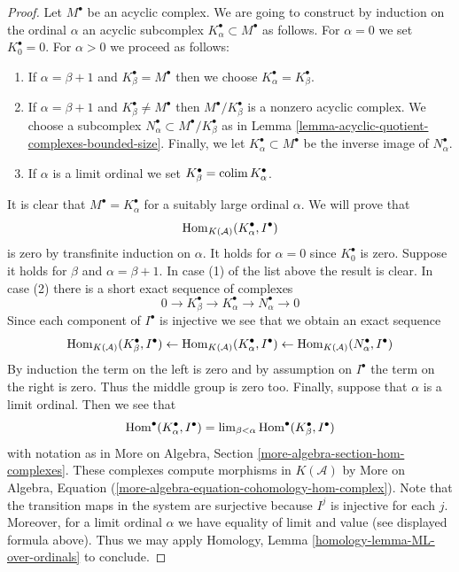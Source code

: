 \begin{proof}
Let $M^\bullet$ be an acyclic complex. We are going to construct by
induction on the ordinal $\alpha$ an acyclic subcomplex
$K_\alpha^\bullet \subset M^\bullet$ as follows.
For $\alpha = 0$ we set $K_0^\bullet = 0$. For $\alpha > 0$
we proceed as follows:
\begin{enumerate}
\item If $\alpha = \beta + 1$ and $K_\beta^\bullet = M^\bullet$
then we choose $K_\alpha^\bullet = K_\beta^\bullet$.
\item If $\alpha = \beta + 1$ and $K_\beta^\bullet \not = M^\bullet$
then $M^\bullet/K_\beta^\bullet$ is a nonzero acyclic complex.
We choose a subcomplex $N_\alpha^\bullet \subset M^\bullet/K_\beta^\bullet$
as in Lemma \ref{lemma-acyclic-quotient-complexes-bounded-size}.
Finally, we let $K_\alpha^\bullet \subset M^\bullet$
be the inverse image of $N_\alpha^\bullet$.
\item If $\alpha$ is a limit ordinal we set
$K_\beta^\bullet = \mathop{\mathrm{colim}}\nolimits K_\alpha^\bullet$.
\end{enumerate}
It is clear that $M^\bullet = K_\alpha^\bullet$ for a suitably large
ordinal $\alpha$. We will prove that
$$
\mathop{\mathrm{Hom}}\nolimits_{K(\mathcal{A})}(K_\alpha^\bullet, I^\bullet)
$$
is zero by transfinite induction on $\alpha$. It holds for $\alpha = 0$
since $K_0^\bullet$ is zero. Suppose it holds for $\beta$ and
$\alpha = \beta + 1$. In case (1) of the list above the result is clear.
In case (2) there is a short exact sequence of complexes
$$
0 \to K_\beta^\bullet \to K_\alpha^\bullet \to N_\alpha^\bullet \to 0
$$
Since each component of $I^\bullet$ is injective we see that we obtain
an exact sequence
$$
\mathop{\mathrm{Hom}}\nolimits_{K(\mathcal{A})}(K_\beta^\bullet, I^\bullet) \leftarrow
\mathop{\mathrm{Hom}}\nolimits_{K(\mathcal{A})}(K_\alpha^\bullet, I^\bullet) \leftarrow
\mathop{\mathrm{Hom}}\nolimits_{K(\mathcal{A})}(N_\alpha^\bullet, I^\bullet)
$$
By induction the term on the left is zero and by assumption on $I^\bullet$
the term on the right is zero. Thus the middle group is zero too.
Finally, suppose that $\alpha$ is a limit ordinal. Then we see that
$$
\mathop{\mathrm{Hom}}\nolimits^\bullet(K_\alpha^\bullet, I^\bullet) =
\mathop{\mathrm{lim}}\nolimits_{\beta < \alpha} \mathop{\mathrm{Hom}}\nolimits^\bullet(K_\beta^\bullet, I^\bullet)
$$
with notation as in
More on Algebra, Section \ref{more-algebra-section-hom-complexes}.
These complexes compute morphisms in $K(\mathcal{A})$ by
More on Algebra, Equation
(\ref{more-algebra-equation-cohomology-hom-complex}).
Note that the transition maps in the system are surjective
because $I^j$ is injective for each $j$. Moreover, for a limit
ordinal $\alpha$ we have equality of limit and value
(see displayed formula above). Thus we may apply
Homology, Lemma \ref{homology-lemma-ML-over-ordinals}
to conclude.
\end{proof}

